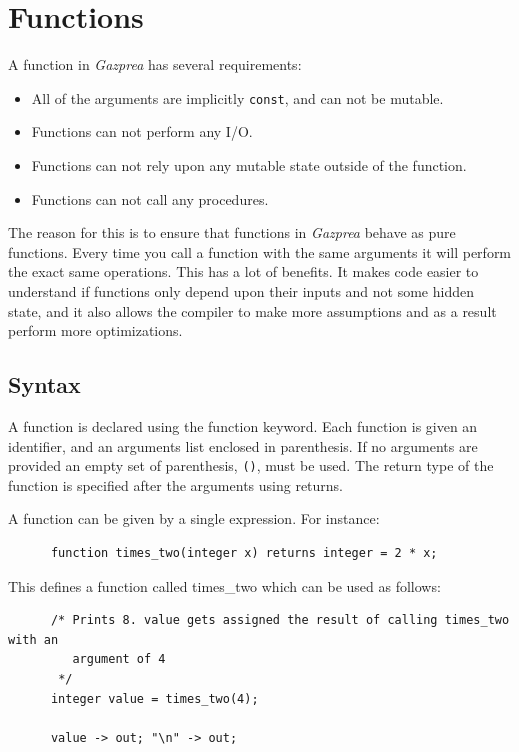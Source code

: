 \documentclass{article}
\begin{document}
\section{Functions}\label{sec:function}

  A function in \textit{Gazprea} has several requirements:

  \begin{itemize}
    \item All of the arguments are implicitly \texttt{const}, and can not be mutable.
    \item Functions can not perform any I/O.
    \item Functions can not rely upon any mutable state outside of the function.
    \item Functions can not call any procedures.
  \end{itemize}

  The reason for this is to ensure that functions in \textit{Gazprea} behave as pure functions. Every time you call a
  function with the same arguments it will perform the exact same operations. This has a lot of benefits. It makes
  code easier to understand if functions only depend upon their inputs and not some hidden state, and it also allows
  the compiler to make more assumptions and as a result perform more optimizations.

  \subsection{Syntax}

    A function is declared using the function keyword. Each function is given an identifier, and an arguments list
    enclosed in parenthesis. If no arguments are provided an empty set of parenthesis, \texttt{()}, must be used.
    The return type of the function is specified after the arguments using returns.

    A function can be given by a single expression. For instance:

    \begin{lstlisting}
      function times_two(integer x) returns integer = 2 * x;
    \end{lstlisting}

    This defines a function called times\_two which can be used as follows:

    \begin{lstlisting}
      /* Prints 8. value gets assigned the result of calling times_two with an
         argument of 4
       */
      integer value = times_two(4);

      value -> out; "\n" -> out;
    \end{lstlisting}
\end{document}
